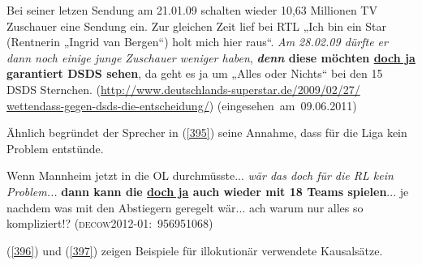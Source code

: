 \begin{exe}
	\ex\label{394}

	Bei seiner letzen Sendung am 21.01.09 schalten wieder 10,63 Millionen TV  Zuschauer eine Sendung ein. Zur gleichen Zeit lief bei RTL „Ich bin ein 	Star (Rentnerin „Ingrid van Bergen“) holt mich hier raus“. \emph{Am 28.02.09 dürfte er dann noch einige junge Zuschauer weniger haben}, 		\textbf{\textit{denn} diese möchten \underline{doch ja} garantiert DSDS sehen}, da geht es ja um „Alles oder Nichts“ bei den 15 DSDS 				Sternchen. 	
	\newline
	{\scriptsize(\url{http://www.deutschlands-superstar.de/2009/02/27/                                                                                     	wettendass-gegen-dsds-die-entscheidung/})	}
	\newline
	\hbox{}\hfill\hbox{(eingesehen am 09.06.2011) \citep[176]{Mueller2014a}}
\end{exe}        
Ähnlich begründet der Sprecher in (\ref{395}) seine Annahme, dass für die Liga kein Problem entstünde.

\begin{exe}
	\ex\label{395}

	Wenn Mannheim jetzt in die OL durchmüsste... \emph{wär das doch für die RL kein Problem...} \textbf{dann kann die \underline{doch ja} auch wieder mit 		18 Teams spielen}... je nachdem was mit den Abstiegern geregelt wär... ach warum nur alles so kompliziert!? 	
	\hfill\hbox{\scshape(decow2012-01: 956951068)}
\end{exe} 
(\ref{396}) und (\ref{397}) zeigen Beispiele für illokutionär  verwendete Kausalsätze.
 
